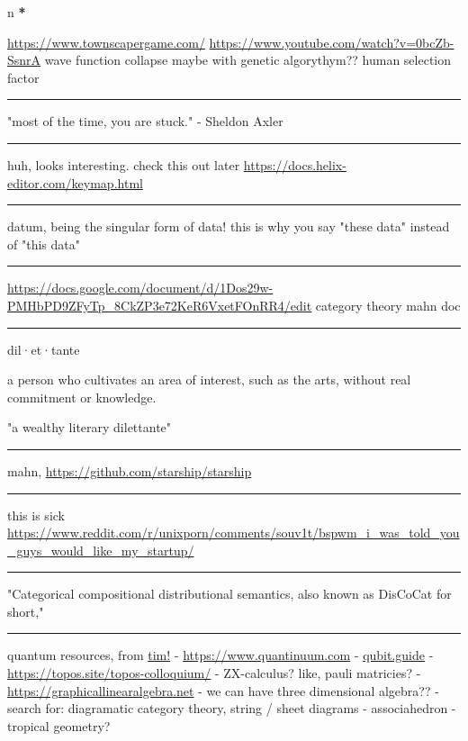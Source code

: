 \documentclass[letterpaper]{article}
\date{\today}
\title{}
\renewcommand{\tableofcontents}{}
\begin{document}
\tableofcontents

n \textbf{*}

\href{https://www.youtube.com/redirect?event=video\_description\&redir\_token=QUFFLUhqbWU5b05DZzZyX0syeGltbVAzSUZGWkFySTFEZ3xBQ3Jtc0tuX1VZUTFUcHFsaklnd2FFYnlFV1pseDU3Q1hxMm40aWcybXVtMGNkVXhrYWVQaThuY0E2dXJNR2dkVm1rZ3A3NkVTZ2pJWEhVblVDV0ZKcXdFdFZTdHA5b3V4aXExVWFRLXVpeVhtSlpnNDhBYjU5Yw\&q=https\%3A\%2F\%2Fwww.townscapergame.com\%2F}{https://www.townscapergame.com/}
\url{https://www.youtube.com/watch?v=0bcZb-SsnrA} wave function collapse maybe
with genetic algorythym?? human selection factor

\noindent\rule{\textwidth}{0.5pt}

"most of the time, you are stuck." - Sheldon Axler

\noindent\rule{\textwidth}{0.5pt}

huh, looks interesting. check this out later
\url{https://docs.helix-editor.com/keymap.html}

\noindent\rule{\textwidth}{0.5pt}

datum, being the singular form of data! this is why you say "these data"
instead of "this data"

\noindent\rule{\textwidth}{0.5pt}

\url{https://docs.google.com/document/d/1Dos29w-PMHbPD9ZFyTp\_8CkZP3e72KeR6VxetFOnRR4/edit}
category theory mahn doc

\noindent\rule{\textwidth}{0.5pt}

dil·et·tante

a person who cultivates an area of interest, such as the arts, without
real commitment or knowledge.

"a wealthy literary dilettante"

\noindent\rule{\textwidth}{0.5pt}

mahn, \url{https://github.com/starship/starship}

\noindent\rule{\textwidth}{0.5pt}

this is sick
\url{https://www.reddit.com/r/unixporn/comments/souv1t/bspwm\_i\_was\_told\_you\_guys\_would\_like\_my\_startup/}

\noindent\rule{\textwidth}{0.5pt}

"Categorical compositional distributional semantics, also known as
DisCoCat for short,"

\noindent\rule{\textwidth}{0.5pt}

quantum resources, from \href{https://thosgood.com}{tim!} -
\url{https://www.quantinuum.com} - \href{https://qubit.guide}{qubit.guide} -
\url{https://topos.site/topos-colloquium/} - ZX-calculus? like, pauli
matricies? - \url{https://graphicallinearalgebra.net} - we can have three
dimensional algebra?? - search for: diagramatic category theory, string
/ sheet diagrams - associahedron - tropical geometry?
\end{document}
